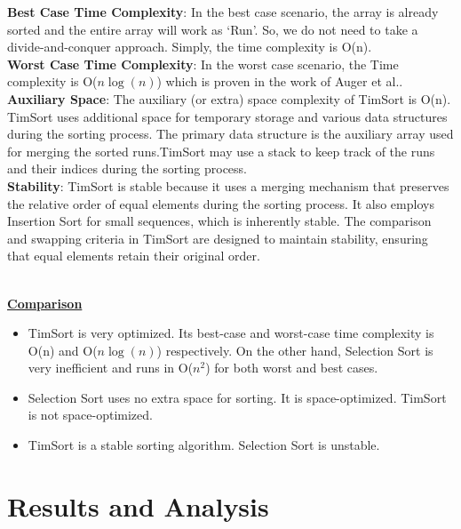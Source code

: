 \documentclass[article,10pt]{article}
\begin{document}
\begin{multicols}{2}
\textbf{Best Case Time Complexity}: In the best case scenario, the array is already sorted and the entire array will work as ‘Run’. So, we do not need to take a divide-and-conquer approach. Simply, the time complexity is O(n).\\

\textbf{Worst Case Time Complexity}: In the worst case scenario, the Time complexity is O($n\log(n)$) which is proven in the work of Auger et al.\cite{Auger-2015, Auger-2019}.\\

\textbf{Auxiliary Space}: The auxiliary (or extra) space complexity of TimSort is O(n). TimSort uses additional space for temporary storage and various data structures during the sorting process. The primary data structure is the auxiliary array used for merging the sorted runs.TimSort may use a stack to keep track of the runs and their indices during the sorting process.\\ 

\textbf{Stability}: TimSort is stable because it uses a merging mechanism that preserves the relative order of equal elements during the sorting process. It also employs Insertion Sort for small sequences, which is inherently stable. The comparison and swapping criteria in TimSort are designed to maintain stability, ensuring that equal elements retain their original order.\\\\

\begin{center} \underline{\textbf{Comparison}} \end{center}
\begin{itemize}
	\item TimSort is very optimized. Its best-case and worst-case time complexity is O(n) and O($n\log(n)$) respectively. On the other hand, Selection Sort is very inefficient and runs in O($n^2$) for both worst and best cases.
	\item Selection Sort uses no extra space for sorting. It is space-optimized. TimSort is not space-optimized.
	\item TimSort is a stable sorting algorithm. Selection Sort is unstable.
\end{itemize}








\section{Results and Analysis}


\end{multicols}
\end{document}
